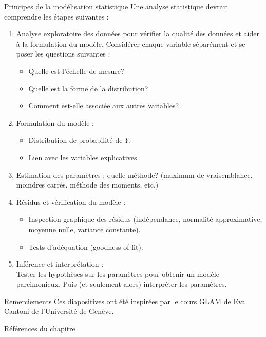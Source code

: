 \documentclass{BeamerTemplate}
\begin{document}
\begin{refsection}
\begin{frame}[allowframebreaks]{Principes de la modélisation statistique}
Une analyse statistique devrait comprendre les étapes suivantes :
\begin{enumerate}
\item {\color{blue}Analyse exploratoire des données} pour vérifier la qualité des données et aider
à la formulation du modèle. Considérer chaque variable séparément et se poser les
questions suivantes :
\begin{itemize}
\item Quelle est l'échelle de mesure?
\item Quelle est la forme de la distribution?
\item Comment est-elle associée aux autres variables?
\end{itemize}
\item {\color{blue}Formulation du modèle} :
  \begin{itemize}
  \item Distribution de probabilité de $Y$.
  \item Lien avec les variables explicatives.
  \end{itemize}
\item {\color{blue}Estimation des paramètres} : quelle méthode? (maximum de vraisemblance,
moindres carrés, méthode des moments, etc.)
\newpage
\item {\color{blue}Résidus et vérification du modèle} :
  \begin{itemize}
  \item Inspection graphique des résidus (indépendance, normalité approximative, moyenne nulle, variance constante).
  \item Tests d'adéquation (goodness of fit).
  \end{itemize}
\item {\color{blue}Inférence et interprétation} :\\
Tester les hypothèses sur les paramètres pour obtenir un modèle parcimonieux. Puis (et seulement
alors) interpréter les paramètres.
\end{enumerate}

\end{frame}

\begin{frame}{Remerciements}
Ces diapositives ont été inspirées par le cours GLAM de Eva Cantoni de l'Université de Genève.
\end{frame}

\begin{frame}[allowframebreaks]{Références du chapitre}
\tiny
\printbibliography[heading=none,section=\therefsection]
\end{frame}

\end{refsection}
\end{document}
